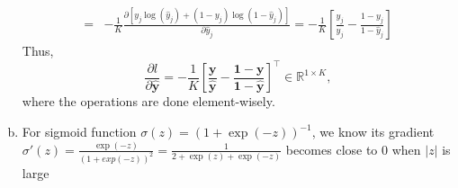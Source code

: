 \documentclass[10pt,a4paper]{article}
\theoremstyle{dotlessP}
\def\RR{\mathbb{R}}
\newcommand{\dldy}{\frac{\partial l}{\partial \bm{\hat{y}}}}
\newcommand{\yh}{\bm{\hat{y}}}
\begin{document}
\begin{enumerate}[(a)]
\begin{equation}
\begin{aligned}
=& -\frac{1}{K}\frac{\partial[y_j\log(\hat{y}_j)+(1-y_j)\log(1-\hat{y}_j)]}{\partial \hat{y}_j} = -\frac{1}{K}\left[\frac{y_j}{\hat{y}_j}-\frac{1-y_j}{1-\hat{y}_j}\right]
\end{aligned}
\end{equation}
Thus, 
\begin{equation}
\dldy = -\frac{1}{K}\left[ \frac{\bm y}{\yh}-\frac{\bm 1-\bm y}{\bm 1-\yh}\right]^\top\in \RR^{1\times K},
\end{equation}
where the operations are done element-wisely.
\item For sigmoid function $\sigma(z)=(1+\exp(-z))^{-1}$, we know its gradient $\sigma'(z)=\frac{\exp(-z)}{(1+exp(-z))^2}=\frac{1}{2+\exp(z)+\exp(-z)}$ becomes close to 0 when $|z|$ is large
\end{enumerate}
\end{document}
